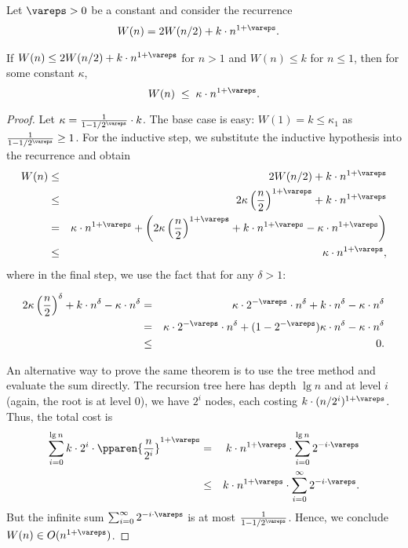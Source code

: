 \begin{flex}
\begin{theorem}
\label{thm:analysis::recurrences::linear-plus}
Let $\vareps > 0$ be a
constant and consider  the recurrence
\begin{align*}
  W(n) & = 2W(n/2) + k\cdot n^{1+\vareps}.
\end{align*}

  If $W(n) \leq 2 W(n/2) + k \cdot n^{1+\vareps}$ for $n > 1$ and $W(n) \leq k$ for $n \leq
  1$, then for some constant $\kappa$, \[ W(n) \;\leq\;
  \kappa \cdot n^{1+\vareps}. \]
\end{theorem}

\begin{proof}
  Let $\kappa = \frac1{1-1/2^{\vareps}} \cdot k$. The base case is easy: $W(1) =
  k \leq \kappa_1$ as $\frac1{1 - 1/2^{\vareps}} \geq 1$.  For the inductive
  step, we substitute the inductive hypothesis into the recurrence and obtain
  \begin{eqnarray*}
    W(n) &\leq& 2W(n/2) + k \cdot n^{1+\vareps}\\
    &\leq& 2 \kappa\left(\frac{n}2 \right)^{1+\vareps} + k \cdot n^{1+\vareps}\\
    &=& \kappa \cdot n^{1+\vareps} + \left(2 \kappa\left(\frac{n}2 \right)^{1+\vareps} +
      k \cdot n^{1+\vareps} - \kappa \cdot n^{1+\vareps}\right)\\
    &\leq& \kappa \cdot n^{1+\vareps},
  \end{eqnarray*}
  where in the final step, we use the fact  that for any $\delta > 1$:

  \begin{eqnarray*}
    2 \kappa\left(\frac{n}2 \right)^{\delta} +
    k \cdot n^{\delta} - \kappa \cdot n^{\delta}
    &=& \kappa \cdot 2^{-\vareps} \cdot n^{\delta}  +
    k \cdot n^{\delta} - \kappa \cdot n^{\delta} \\
    &=& \kappa \cdot 2^{-\vareps} \cdot n^{\delta}  +
    (1 - 2^{-\vareps})\kappa\cdot n^{\delta} - \kappa \cdot n^{\delta} \\
    &\leq& 0.
  \end{eqnarray*}


An alternative way to prove the same theorem is to use the tree method
and evaluate the sum directly. The recursion tree here has depth $\lg
n$ and at level $i$ (again, the root is at level $0$), we have $2^i$
nodes, each costing $k\cdot (n/2^i)^{1+\vareps}$.  Thus, the total
cost is
  \begin{eqnarray*}
    \sum_{i=0}^{\lg n} k\cdot 2^i \cdot \pparen{\frac{n}{2^i}}^{1+\vareps}
    &=&  k\cdot n^{1+\vareps} \cdot \sum_{i=0}^{\lg n} 2^{-i\cdot\vareps} \\
    &\leq& k\cdot n^{1+\vareps} \cdot \sum_{i=0}^{\infty} 2^{-i\cdot\vareps}.
  \end{eqnarray*}
  But the infinite sum $\sum_{i=0}^{\infty} 2^{-i\cdot\vareps}$ is at most
  $\frac1{1 - 1/2^{\vareps}}$. Hence, we conclude $W(n) \in O(n^{1+\vareps})$.


\end{proof}
\end{flex}
